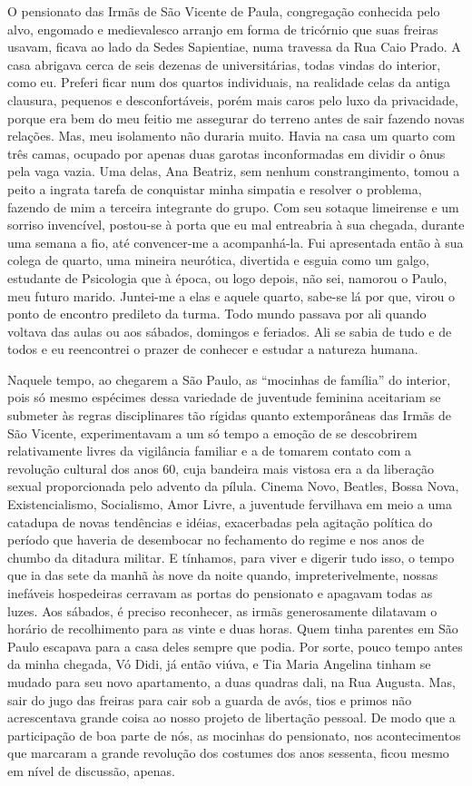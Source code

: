 O pensionato das Irmãs de São Vicente de Paula, congregação conhecida pelo alvo, engomado e medievalesco arranjo em forma de tricórnio que suas freiras usavam, ficava ao lado da Sedes Sapientiae, numa travessa da Rua Caio Prado.
A casa abrigava cerca de seis dezenas de universitárias, todas vindas do interior, como eu.
Preferi ficar num dos quartos individuais, na realidade celas da antiga clausura, pequenos e desconfortáveis, porém mais caros pelo luxo da privacidade, porque era bem do meu feitio me assegurar do terreno antes de sair fazendo novas relações.
Mas, meu isolamento não duraria muito.
Havia na casa um quarto com três camas, ocupado por apenas duas garotas inconformadas em dividir o ônus pela vaga vazia.
Uma delas, Ana Beatriz, sem nenhum constrangimento, tomou a peito a ingrata tarefa de conquistar minha simpatia e resolver o problema, fazendo de mim a terceira integrante do grupo.
Com seu sotaque limeirense e um sorriso invencível, postou-se à porta que eu mal entreabria à sua chegada, durante uma semana a fio, até convencer-me a acompanhá-la.
Fui apresentada então à sua colega de quarto, uma mineira neurótica, divertida e esguia como um galgo, estudante de Psicologia que à época, ou logo depois, não sei, namorou o Paulo, meu futuro marido.
Juntei-me a elas e aquele quarto, sabe-se lá por que, virou o ponto de encontro predileto da turma.
Todo mundo passava por ali quando voltava das aulas ou aos sábados, domingos e feriados.
Ali se sabia de tudo e de todos e eu reencontrei o prazer de conhecer e estudar a natureza humana.


Naquele tempo, ao chegarem a São Paulo, as ``mocinhas de família'' do interior, pois só mesmo espécimes dessa variedade de juventude feminina aceitariam se submeter às regras disciplinares tão rígidas quanto extemporâneas das Irmãs de São Vicente, experimentavam a um só tempo a emoção de se descobrirem relativamente livres da vigilância familiar e a de tomarem contato com a revolução cultural dos anos 60, cuja bandeira mais vistosa era a da liberação sexual proporcionada pelo advento da pílula.
Cinema Novo, Beatles, Bossa Nova, Existencialismo, Socialismo, Amor Livre, a juventude fervilhava em meio a uma catadupa de novas tendências e idéias, exacerbadas pela agitação política do período que haveria de desembocar no fechamento do regime e nos anos de chumbo da ditadura militar.
E tínhamos, para viver e digerir tudo isso, o tempo que ia das sete da manhã às nove da noite quando, impreterivelmente, nossas inefáveis hospedeiras cerravam as portas do pensionato e apagavam todas as luzes.
Aos sábados, é preciso reconhecer, as irmãs generosamente dilatavam o horário de recolhimento para as vinte e duas horas.
Quem tinha parentes em São Paulo escapava para a casa deles sempre que podia.
Por sorte, pouco tempo antes da minha chegada, Vó Didi, já então viúva, e Tia Maria Angelina tinham se mudado para seu novo apartamento, a duas quadras dali, na Rua Augusta.
Mas, sair do jugo das freiras para cair sob a guarda de avós, tios e primos não acrescentava grande coisa ao nosso projeto de libertação pessoal.
De modo que a participação de boa parte de nós, as mocinhas do pensionato, nos acontecimentos que marcaram a grande revolução dos costumes dos anos sessenta, ficou mesmo em nível de discussão, apenas.

